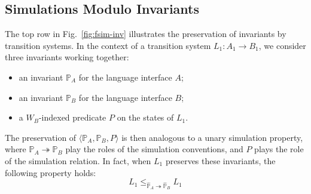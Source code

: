 \documentclass[sigplan,screen]{acmart}
\newenvironment{optional}{}{}
\begin{document}
\begin{optional}
\begin{figure*}
  \caption{Simulation with invariants.
    Circles indicate questions, answers and states
    which satisfy the appropriate invariants.
    When the transition system $L_1$ preserves the invariants
    in the way shown in the top row,
    a simulation of $L_1$ by $L_2$ can be established through
    the weakened diagrams shown in the bottom row.
    The resulting simulation uses the convention
    $\mathbb{P}_A \cdot \mathbb{R}_A \twoheadrightarrow
     \mathbb{P}_B \cdot \mathbb{R}_B$,
    ensuring that the environment
    establishes and preserves the appropriate invariants
    on questions and answers.
    The simulation relation $P \cdot R$ then ensures that
    the strengthened assumptions used by the
    weakened simulation diagrams can be satisfied.}
  \label{fig:fsim-inv}
\end{figure*}

\subsection{Simulations Modulo Invariants} \label{sec:fsim-inv} %

The top row in Fig.~\ref{fig:fsim-inv}
illustrates the preservation of invariants by transition systems.
In the context of a transition system
$L_1 : A_1 \rightarrow B_1$,
we consider three invariants working together:
\begin{itemize}
  \item an invariant $\mathbb{P}_A$ for the language interface $A$;
  \item an invariant $\mathbb{P}_B$ for the language interface $B$;
  \item a $W_B$-indexed predicate $P$ on the states of $L_1$.
\end{itemize}
The preservation of
$\langle \mathbb{P}_A, \mathbb{P}_B, P \rangle$
is then analogous to a unary simulation property,
where $\mathbb{P}_A \twoheadrightarrow \mathbb{P}_B$
play the roles of the simulation conventions,
and $P$ plays the role of the simulation relation.
In fact,
when $L_1$ preserves these invariants,
the following property holds:
\[
    L_1 \le_{\hat{\mathbb{P}}_A \twoheadrightarrow \hat{\mathbb{P}}_B} L_1
\]


\end{optional}
\end{document}

